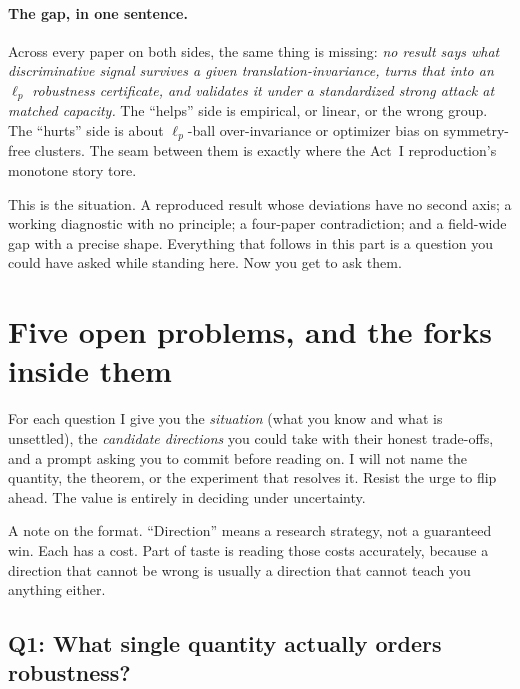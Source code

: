 \paragraph{The gap, in one sentence.} Across every paper on both sides, the same thing is missing:
\emph{no result says what discriminative signal survives a given translation-invariance, turns that
into an $\ell_p$ robustness certificate, and validates it under a standardized strong attack at
matched capacity.} The ``helps'' side is empirical, or linear, or the wrong group. The ``hurts''
side is about $\ell_p$-ball over-invariance or optimizer bias on symmetry-free clusters. The seam
between them is exactly where the Act~I reproduction's monotone story tore.

This is the situation. A reproduced result whose deviations have no second axis; a working diagnostic
with no principle; a four-paper contradiction; and a field-wide gap with a precise shape. Everything
that follows in this part is a question you could have asked while standing here. Now you get to ask
them.

\section{Five open problems, and the forks inside them}
\label{sec:p2-problems}

For each question I give you the \emph{situation} (what you know and what is unsettled), the
\emph{candidate directions} you could take with their honest trade-offs, and a prompt asking you to
commit before reading on. I will not name the quantity, the theorem, or the experiment that resolves
it. Resist the urge to flip ahead. The value is entirely in deciding under uncertainty.

A note on the format. ``Direction'' means a research strategy, not a guaranteed win. Each has a cost.
Part of taste is reading those costs accurately, because a direction that cannot be wrong is usually
a direction that cannot teach you anything either.

\subsection{Q1: What single quantity actually orders robustness?}
\label{sub:p2-q1}

